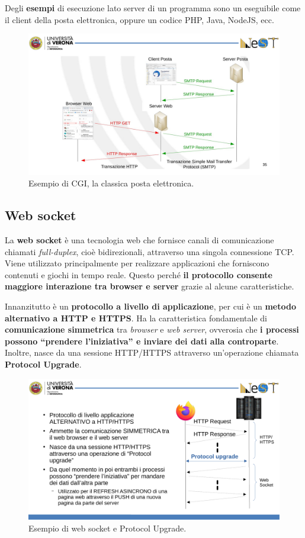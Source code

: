 \documentclass[a4paper]{article}
\newcommand{\dquotes}[1]{``#1''}
\begin{document}
	\noindent
	Degli \textcolor{Green4}{\textbf{esempi}} di esecuzione lato server di un programma sono un eseguibile come il client della posta elettronica, oppure un codice PHP, Java, NodeJS, ecc.\newpage
	
	\begin{figure}[!htp]
		\centering
		\includegraphics[width=\textwidth]{img/CGI_esempio.pdf}
		\caption{Esempio di CGI, la classica posta elettronica.}
	\end{figure}\newpage

	\subsection{Web socket}
	
	La \textcolor{Red3}{\textbf{web socket}} è una tecnologia web che fornisce canali di comunicazione chiamati \emph{full-duplex}, cioè bidirezionali, attraverso una singola connessione TCP. Viene utilizzato principalmente per realizzare applicazioni che forniscono contenuti e giochi in tempo reale. Questo perché \textbf{il protocollo consente maggiore interazione tra browser e server} grazie al alcune caratteristiche.\newline
	
	\noindent
	Innanzitutto è un \textbf{protocollo a livello di applicazione}, per cui è un \textbf{metodo alternativo a HTTP e HTTPS}. Ha la caratteristica fondamentale di \textbf{comunicazione simmetrica} tra \emph{browser} e \emph{web server}, ovverosia che \textbf{i processi possono \dquotes{prendere l'iniziativa} e inviare dei dati alla controparte}. Inoltre, nasce da una sessione HTTP/HTTPS attraverso un'operazione chiamata \textbf{Protocol Upgrade}.
	\begin{figure}[!htp]
		\centering
		\includegraphics[width=.5\textwidth]{img/web_socket.pdf}
		\caption{Esempio di web socket e Protocol Upgrade.}
	\end{figure}
	
\end{document}
